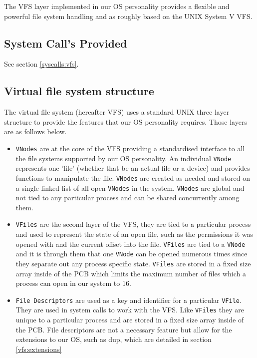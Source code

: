 \documentclass[12pt,english]{article}
\begin{document}
The VFS layer implemented in our OS personality provides a flexible and powerful file system handling and as roughly based on the UNIX System V VFS.

\subsection{System Call's Provided} \label{vfs:syscalls}

See section \ref{syscalls:vfs}.

\subsection{Virtual file system structure} \label{vfs:vfs_struct}

The virtual file system (hereafter VFS) uses a standard UNIX three layer structure to provide the features that our OS personality requires. Those layers are as follows below.

\begin{itemize}
\item \texttt{VNodes} are at the core of the VFS providing a standardised interface to all the file systems supported by our OS personality. An individual \texttt{VNode} represents one 'file' (whether that be an actual file or a device) and provides functions to manipulate the file. \texttt{VNodes} are created as needed and stored on a single linked list of all open \texttt{VNodes} in the system. \texttt{VNodes} are global and not tied to any particular process and can be shared concurrently among them.
\item \texttt{VFiles} are the second layer of the VFS, they are tied to a particular process and used to represent the state of an open file, such as the permissions it was opened with and the current offset into the file. \texttt{VFiles} are tied to a \texttt{VNode} and it is through them that one \texttt{VNode} can be opened numerous times since they separate out any process specific state. \texttt{VFiles} are stored in a fixed size array inside of the PCB which limits the maximum number of files which a process can open in our system to 16.
\item \texttt{File Descriptors} are used as a key and identifier for a particular \texttt{VFile}. They are used in system calls to work with the VFS. Like \texttt{VFiles} they are unique to a particular process and are stored in a fixed size array inside of the PCB. File descriptors are not a necessary feature but allow for the extensions to our OS, such as dup, which are detailed in section \ref{vfs:extensions}
\end{itemize}
\end{document}
